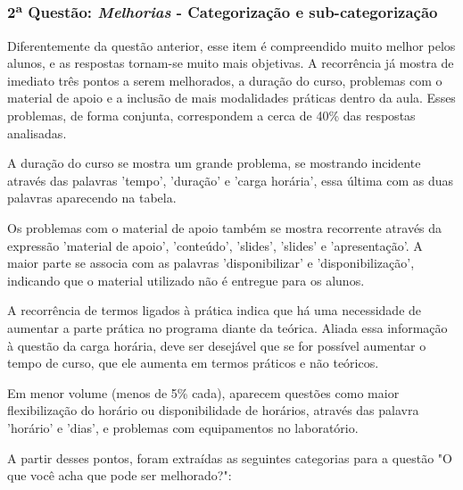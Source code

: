 

\subsubsection*{2\textsuperscript{a} Questão: \textit{Melhorias} - Categorização e sub-categorização }

Diferentemente da questão anterior, esse item é compreendido muito melhor pelos alunos, e as respostas tornam-se muito mais objetivas. A recorrência já mostra de imediato três pontos a serem melhorados, a duração do curso, problemas com o material de apoio e a inclusão de mais modalidades práticas dentro da aula. Esses problemas, de forma conjunta, correspondem a cerca de 40\% das respostas analisadas.

A duração do curso se mostra um grande problema, se mostrando incidente através das palavras 'tempo', 'duração' e 'carga horária', essa última com as duas palavras aparecendo na tabela.

Os problemas com o material de apoio também se mostra recorrente através da expressão 'material de apoio', 'conteúdo', 'slides', 'slides' e 'apresentação'. A maior parte se associa com as palavras 'disponibilizar' e 'disponibilização', indicando que o material utilizado não é entregue para os alunos.

A recorrência de termos ligados à prática indica que há uma necessidade de aumentar a parte prática no programa diante da teórica. Aliada essa informação à questão da carga horária, deve ser desejável que se for possível aumentar o tempo de curso, que ele aumenta em termos práticos e não teóricos.

Em menor volume (menos de 5\% cada), aparecem questões como maior flexibilização do horário ou disponibilidade de horários, através das palavra 'horário' e 'dias', e problemas com equipamentos no laboratório.

A partir desses pontos, foram extraídas as seguintes categorias para a questão "O que você acha que pode ser melhorado?":

